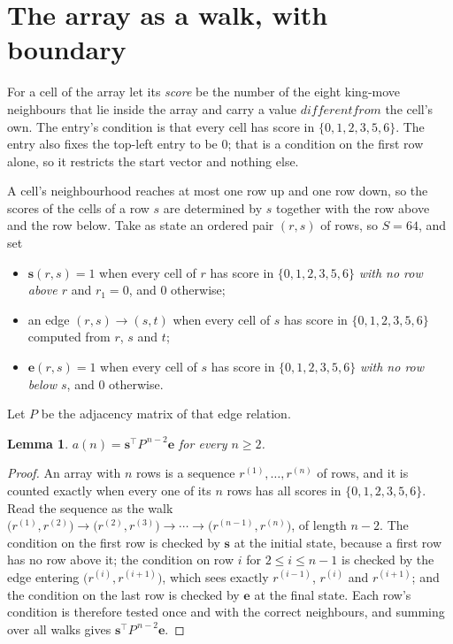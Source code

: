 \documentclass[11pt,a4paper]{article}
\theoremstyle{plain}
\newtheorem{lemma}[theorem]{Lemma}
\theoremstyle{definition}
\begin{document}
\section{The array as a walk, with boundary}

For a cell of the array let its \emph{score} be the number of the eight king-move neighbours that lie inside
the array and carry a value $different from$ the cell's own. The entry's condition is that every cell
has score in $\{0,1,2,3,5,6\}$. The entry also fixes the top-left entry to be $0$; that is a condition on the first row alone, so it restricts the start vector and nothing else.

A cell's neighbourhood reaches at most one row up and one row down, so the scores of the
cells of a row $s$ are determined by $s$ together with the row above and the row below.
Take as state an ordered pair $(r,s)$ of rows, so $S=64$, and set
\begin{itemize}
\item $\mathbf{s}(r,s)=1$ when every cell of $r$ has score in $\{0,1,2,3,5,6\}$ \emph{with no row
above $r$} and $r_1=0$, and $0$ otherwise;
\item an edge $(r,s)\to(s,t)$ when every cell of $s$ has score in $\{0,1,2,3,5,6\}$ computed from
$r$, $s$ and $t$;
\item $\mathbf{e}(r,s)=1$ when every cell of $s$ has score in $\{0,1,2,3,5,6\}$ \emph{with no row
below $s$}, and $0$ otherwise.
\end{itemize}
Let $P$ be the adjacency matrix of that edge relation.

\begin{lemma}\label{lem:walk}
$a(n)=\mathbf{s}^{\!\top}P^{\,n-2}\mathbf{e}$ for every $n\ge2$.
\end{lemma}

\begin{proof}
An array with $n$ rows is a sequence $r^{(1)},\dots,r^{(n)}$ of rows, and it is counted
exactly when every one of its $n$ rows has all scores in $\{0,1,2,3,5,6\}$. Read the sequence as the
walk $\bigl(r^{(1)},r^{(2)}\bigr)\to\bigl(r^{(2)},r^{(3)}\bigr)\to\cdots\to
\bigl(r^{(n-1)},r^{(n)}\bigr)$, of length $n-2$. The condition on the first row is
checked by $\mathbf{s}$ at the initial state, because a first row has no row above it; the
condition on row $i$ for $2\le i\le n-1$ is checked by the edge entering
$\bigl(r^{(i)},r^{(i+1)}\bigr)$, which sees exactly $r^{(i-1)}$, $r^{(i)}$ and
$r^{(i+1)}$; and the condition on the last row is checked by $\mathbf{e}$ at the final
state. Each row's condition is therefore tested once and with the correct neighbours, and
summing over all walks gives $\mathbf{s}^{\!\top}P^{\,n-2}\mathbf{e}$.
\end{proof}
\end{document}

